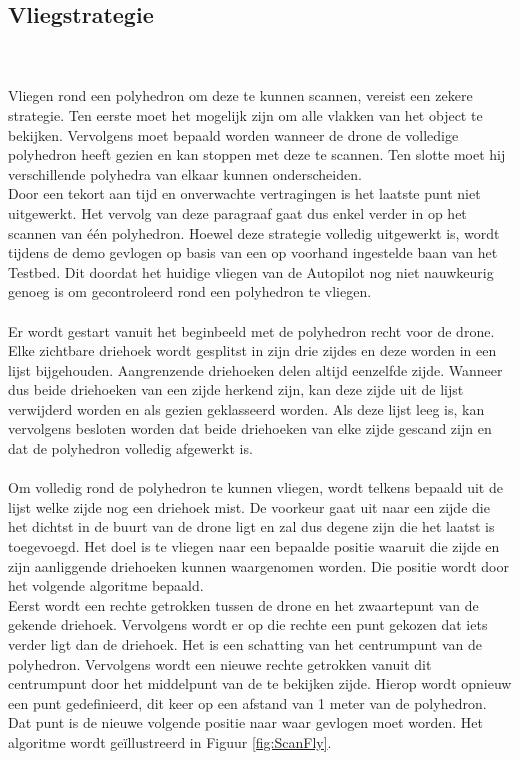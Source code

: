 \subsection{Vliegstrategie}
\\\\
\noindent
Vliegen rond een polyhedron om deze te kunnen scannen, vereist een zekere strategie. Ten eerste moet het mogelijk zijn om alle vlakken van het object te bekijken. Vervolgens moet bepaald worden wanneer de drone de volledige polyhedron heeft gezien en kan stoppen met deze te scannen. Ten slotte moet hij verschillende polyhedra van elkaar kunnen onderscheiden.
\\
Door een tekort aan tijd en onverwachte vertragingen is het laatste punt niet uitgewerkt. Het vervolg van deze paragraaf gaat dus enkel verder in op het scannen van één polyhedron.
Hoewel deze strategie volledig uitgewerkt is, wordt tijdens de demo gevlogen op basis van een op voorhand ingestelde baan van het Testbed. Dit doordat het huidige vliegen van de Autopilot nog niet nauwkeurig genoeg is om gecontroleerd rond een polyhedron te vliegen.
\\\\
Er wordt gestart vanuit het beginbeeld met de polyhedron recht voor de drone. Elke zichtbare driehoek wordt gesplitst in zijn drie zijdes en deze worden in een lijst bijgehouden. Aangrenzende driehoeken delen altijd eenzelfde zijde. Wanneer dus beide driehoeken van een zijde herkend zijn, kan deze zijde uit de lijst verwijderd worden en als gezien geklasseerd worden. Als deze lijst leeg is, kan vervolgens besloten worden dat beide driehoeken van elke zijde gescand zijn en dat de polyhedron volledig afgewerkt is.
\\\\
Om volledig rond de polyhedron te kunnen vliegen, wordt telkens bepaald uit de lijst welke zijde nog een driehoek mist. De voorkeur gaat uit naar een zijde die het dichtst in de buurt van de drone ligt en zal dus degene zijn die het laatst is toegevoegd. Het doel is te vliegen naar een bepaalde positie waaruit die zijde en zijn aanliggende driehoeken kunnen waargenomen worden. Die positie wordt door het volgende algoritme bepaald.
\\
Eerst wordt een rechte getrokken tussen de drone en het zwaartepunt van de gekende driehoek. Vervolgens wordt er op die rechte een punt gekozen dat iets verder ligt dan de driehoek. Het is een schatting van het centrumpunt van de polyhedron. Vervolgens wordt een nieuwe rechte getrokken vanuit dit centrumpunt door het middelpunt van de te bekijken zijde. Hierop wordt opnieuw een punt gedefinieerd, dit keer op een afstand van 1 meter van de polyhedron. Dat punt is de nieuwe volgende positie naar waar gevlogen moet worden. Het algoritme wordt ge\"illustreerd in Figuur \ref{fig:ScanFly}.
